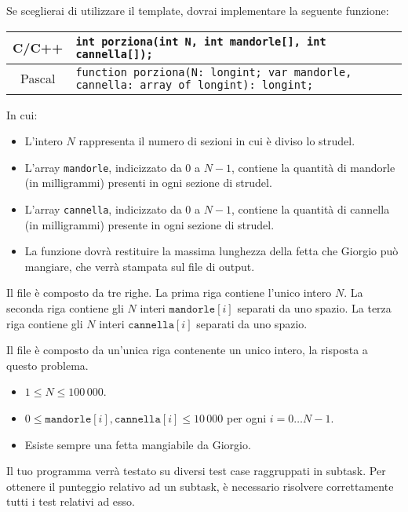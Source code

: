 Se sceglierai di utilizzare il template, dovrai implementare la seguente funzione:
\begin{center}\begin{tabularx}{\textwidth}{|c|X|}
\hline
C/C++  & \verb|int porziona(int N, int mandorle[], int cannella[]);|\\
\hline
Pascal & \small\verb|function porziona(N: longint; var mandorle, cannella: array of longint): longint;|\\
\hline
\end{tabularx}\end{center}
In cui:
\begin{itemize}[nolistsep]
  \item L'intero $N$ rappresenta il numero di sezioni in cui è diviso lo strudel.
  \item L'array \texttt{mandorle}, indicizzato da $0$ a $N-1$, contiene la quantità di mandorle (in milligrammi) presenti in ogni sezione di strudel.
  \item L'array \texttt{cannella}, indicizzato da $0$ a $N-1$, contiene la quantità di cannella (in milligrammi) presente in ogni sezione di strudel.
  \item La funzione dovrà restituire la massima lunghezza della fetta che Giorgio può mangiare, che verrà stampata sul file di output.
\end{itemize}

\InputFile
Il file  è composto da tre righe. La prima riga contiene l'unico intero $N$. La seconda riga contiene gli $N$ interi $\texttt{mandorle}[i]$ separati da uno spazio. La terza riga contiene gli $N$ interi $\texttt{cannella}[i]$ separati da uno spazio.

\OutputFile
Il file \outputfile{} è composto da un'unica riga contenente un unico intero, la risposta a questo problema.

\Constraints
\begin{itemize}[nolistsep, itemsep=2mm]
	\item $1 \le N \le 100\,000$.
	\item $0 \le \texttt{mandorle}[i], \texttt{cannella}[i] \le 10\,000$ per ogni $i=0\ldots N-1$.
	\item Esiste sempre una fetta mangiabile da Giorgio.
\end{itemize}

\Scoring
Il tuo programma verrà testato su diversi test case raggruppati in subtask.
Per ottenere il punteggio relativo ad un subtask, è necessario risolvere
correttamente tutti i test relativi ad esso.

